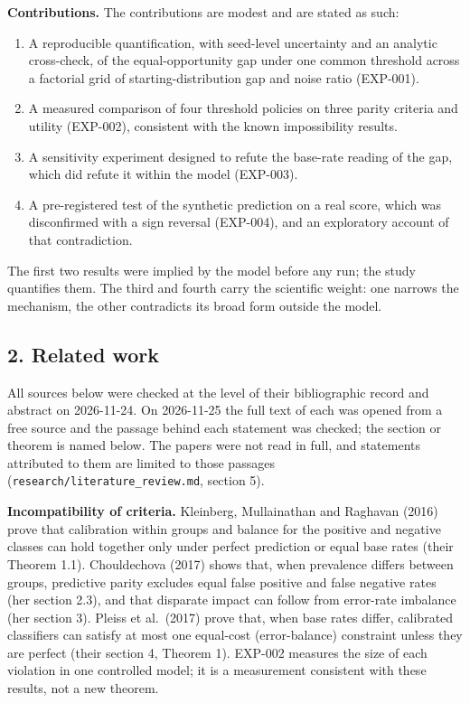 \documentclass[
]{article}
\providecommand{\tightlist}{%
  \setlength{\itemsep}{0pt}\setlength{\parskip}{0pt}}
\begin{document}
\textbf{Contributions.} The contributions are modest and are stated as
such:

\begin{enumerate}
\def\labelenumi{\arabic{enumi}.}
\tightlist
\item
  A reproducible quantification, with seed-level uncertainty and an
  analytic cross-check, of the equal-opportunity gap under one common
  threshold across a factorial grid of starting-distribution gap and
  noise ratio (EXP-001).
\item
  A measured comparison of four threshold policies on three parity
  criteria and utility (EXP-002), consistent with the known
  impossibility results.
\item
  A sensitivity experiment designed to refute the base-rate reading of
  the gap, which did refute it within the model (EXP-003).
\item
  A pre-registered test of the synthetic prediction on a real score,
  which was disconfirmed with a sign reversal (EXP-004), and an
  exploratory account of that contradiction.
\end{enumerate}

The first two results were implied by the model before any run; the
study quantifies them. The third and fourth carry the scientific weight:
one narrows the mechanism, the other contradicts its broad form outside
the model.

\subsection{2. Related work}\label{related-work}

All sources below were checked at the level of their bibliographic
record and abstract on 2026-11-24. On 2026-11-25 the full text of each
was opened from a free source and the passage behind each statement was
checked; the section or theorem is named below. The papers were not read
in full, and statements attributed to them are limited to those passages
(\texttt{research/literature\_review.md}, section 5).

\textbf{Incompatibility of criteria.} Kleinberg, Mullainathan and
Raghavan (2016) prove that calibration within groups and balance for the
positive and negative classes can hold together only under perfect
prediction or equal base rates (their Theorem 1.1). Chouldechova (2017)
shows that, when prevalence differs between groups, predictive parity
excludes equal false positive and false negative rates (her section
2.3), and that disparate impact can follow from error-rate imbalance
(her section 3). Pleiss et al.~(2017) prove that, when base rates
differ, calibrated classifiers can satisfy at most one equal-cost
(error-balance) constraint unless they are perfect (their section 4,
Theorem 1). EXP-002 measures the size of each violation in one
controlled model; it is a measurement consistent with these results, not
a new theorem.
\end{document}
